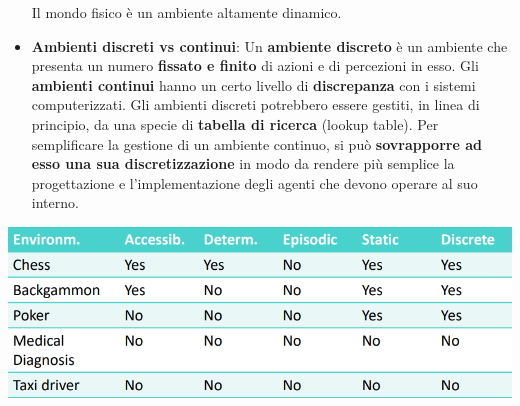 \documentclass[12pt]{article}
\begin{document}
\begin{itemize}
    Il mondo fisico è un ambiente altamente dinamico.
    \item \textbf{Ambienti discreti vs continui}: Un \textbf{ambiente discreto} è un ambiente che presenta un numero \textbf{fissato e finito} di azioni e di percezioni in esso. Gli \textbf{ambienti continui} hanno un certo livello di \textbf{discrepanza} con i sistemi computerizzati.
    Gli ambienti discreti potrebbero essere gestiti, in linea di principio, da una specie di \textbf{tabella di ricerca} (lookup table).
    Per semplificare la gestione di un ambiente continuo, si può \textbf{sovrapporre ad esso una sua discretizzazione} in modo da rendere più semplice la progettazione e l'implementazione degli agenti che devono operare al suo interno.
\end{itemize} 
\begin{center}
    \includegraphics[width = 0.80\linewidth]{Images/17.PNG}
\end{center}
\end{document}
